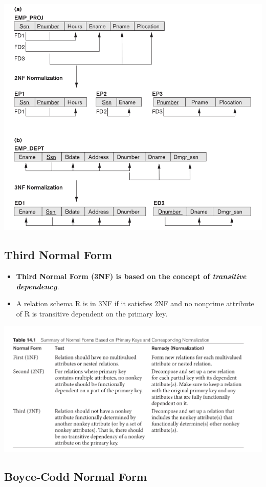 \documentclass[10pt]{article}
\newcommand{\tf}{\textbf}
\newcommand{\ti}{\textit}
\begin{document}
\bigbreak
\includegraphics[scale = 0.7]{2NF.png}
\bigbreak

\subsection{Third Normal Form}

\begin{itemize}
	\item \tf{Third Normal Form (3NF) is based on the concept of \ti{transitive dependency}}.
	\item A relation schema R is in 3NF if it satisfies 2NF and no nonprime attribute of R is transitive dependent on the primary key.
\end{itemize}

\bigbreak
\includegraphics[scale = 0.7]{summary.png}
\bigbreak

\subsection{Boyce-Codd Normal Form}
\end{document}
